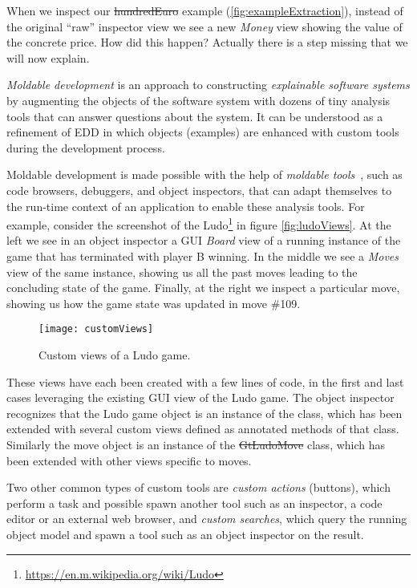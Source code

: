 \documentclass[sigplan,anonymous,review,10pt]{acmart}
\begin{document}
When we inspect our \st{hundredEuro} example (\autoref{fig:exampleExtraction}), instead of the original ``raw'' inspector view we see a new \emph{Money} view showing the value of the concrete price.
How did this happen?
Actually there is a step missing that we will now explain.

\emph{Moldable development} is an approach to constructing \emph{explainable software systems} by augmenting the objects of the software system with dozens of tiny analysis tools that can answer questions about the system.
It can be understood as a refinement of EDD in which objects (examples) are enhanced with custom tools during the development process.

Moldable development is made possible with the help of \emph{moldable tools}~\cite{Chis17a}, such as code browsers, debuggers, and object inspectors, that can adapt themselves to the run-time context of an application to enable these analysis tools.
For example, consider the screenshot of the Ludo\footnote{\url{https://en.m.wikipedia.org/wiki/Ludo}} in figure \autoref{fig:ludoViews}.
At the left we see in an object inspector a GUI \emph{Board} view of a running instance of the game that has terminated with player B winning.
In the middle we see a \emph{Moves} view of the same instance, showing us all the past moves leading to the concluding state of the game.
Finally, at the right we inspect a particular move, showing us how the game state was updated in move \#109.

\begin{figure}[h]
  \texttt{[image: customViews]}
  \caption{Custom views of a Ludo game.}
  \label{fig:ludoViews}
\end{figure}

These views have each been created with a few lines of code, in the first and last cases leveraging the existing GUI view of the Ludo game.
The object inspector recognizes that the Ludo game object is an instance of the  class, 
which has been extended with several custom views defined as annotated methods of that class.
Similarly the move object is an instance of the \st{GtLudoMove} class, which has been extended with other views specific to moves.

Two other common types of custom tools are \emph{custom actions} (\eg buttons), which perform a task and possible spawn another tool such as an inspector, a code editor or an external web browser, and \emph{custom searches}, which query the running object model and spawn a tool such as an object inspector on the result.
\end{document}

